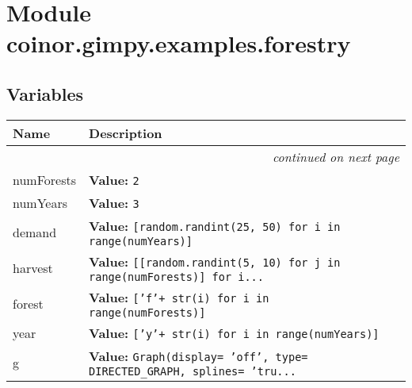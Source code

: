 %
%
%


\section{Module coinor.gimpy.examples.forestry}

    \label{coinor:gimpy:examples:forestry}


  \subsection{Variables}

    \vspace{-1cm}
\hspace{\varindent}\begin{longtable}{|p{\varnamewidth}|p{\vardescrwidth}|l}
\cline{1-2}
\cline{1-2} \centering \textbf{Name} & \centering \textbf{Description}& \\
\cline{1-2}
\endhead\cline{1-2}\multicolumn{3}{r}{\small\textit{continued on next page}}\\\endfoot\cline{1-2}
\endlastfoot\raggedright n\-u\-m\-F\-o\-r\-e\-s\-t\-s\- & \raggedright \textbf{Value:} 
{\tt 2}&\\
\cline{1-2}
\raggedright n\-u\-m\-Y\-e\-a\-r\-s\- & \raggedright \textbf{Value:} 
{\tt 3}&\\
\cline{1-2}
\raggedright d\-e\-m\-a\-n\-d\- & \raggedright \textbf{Value:} 
{\tt [random.randint(25, 50) for i in range(numYears)]}&\\
\cline{1-2}
\raggedright h\-a\-r\-v\-e\-s\-t\- & \raggedright \textbf{Value:} 
{\tt [[random.randint(5, 10) for j in range(numForests)] for i\texttt{...}}&\\
\cline{1-2}
\raggedright f\-o\-r\-e\-s\-t\- & \raggedright \textbf{Value:} 
{\tt ['f'+ str(i) for i in range(numForests)]}&\\
\cline{1-2}
\raggedright y\-e\-a\-r\- & \raggedright \textbf{Value:} 
{\tt ['y'+ str(i) for i in range(numYears)]}&\\
\cline{1-2}
\raggedright g\- & \raggedright \textbf{Value:} 
{\tt Graph(display= 'off', type= DIRECTED\_GRAPH, splines= 'tru\texttt{...}}&\\
\cline{1-2}
\end{longtable}

